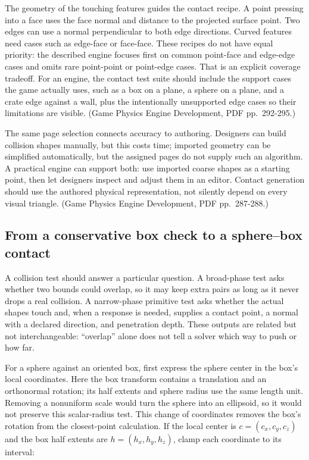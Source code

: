 The geometry of the touching features guides the contact recipe. A point pressing into a face uses the face normal and distance to the projected surface point. Two edges can use a normal perpendicular to both edge directions. Curved features need cases such as edge-face or face-face. These recipes do not have equal priority: the described engine focuses first on common point-face and edge-edge cases and omits rare point-point or point-edge cases. That is an explicit coverage tradeoff. For an engine, the contact test suite should include the support cases the game actually uses, such as a box on a plane, a sphere on a plane, and a crate edge against a wall, plus the intentionally unsupported edge cases so their limitations are visible. (Game Physics Engine Development, PDF pp.~292-295.)

The same page selection connects accuracy to authoring. Designers can build collision shapes manually, but this costs time; imported geometry can be simplified automatically, but the assigned pages do not supply such an algorithm. A practical engine can support both: use imported coarse shapes as a starting point, then let designers inspect and adjust them in an editor. Contact generation should use the authored physical representation, not silently depend on every visual triangle. (Game Physics Engine Development, PDF pp.~287-288.)

\subsection{From a conservative box check to a sphere--box contact}\label{06-engine-ii-ch033-from-a-conservative-box-check-to-a-spherebox-contact}

\hypertarget{06-engine-ii-ch033-from-a-conservative-box-check-to-a-spherebox-contact}{}

A collision test should answer a particular question. A broad-phase test asks whether two bounds could overlap, so it may keep extra pairs as long as it never drops a real collision. A narrow-phase primitive test asks whether the actual shapes touch and, when a response is needed, supplies a contact point, a normal with a declared direction, and penetration depth. These outputs are related but not interchangeable: ``overlap'' alone does not tell a solver which way to push or how far.

For a sphere against an oriented box, first express the sphere center in the box's local coordinates. Here the box transform contains a translation and an orthonormal rotation; its half extents and sphere radius use the same length unit. Removing a nonuniform scale would turn the sphere into an ellipsoid, so it would not preserve this scalar-radius test. This change of coordinates removes the box's rotation from the closest-point calculation. If the local center is \(c=(c_x,c_y,c_z)\) and the box half extents are \(h=(h_x,h_y,h_z)\), clamp each coordinate to its interval:

